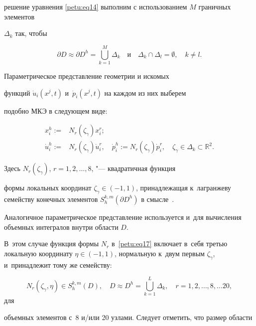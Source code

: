 решение уравнения \eqref{petu:eq14} выполним с использованием $M$ граничных элементов

$\Delta _k$ так, чтобы 

$$\partial D \approx \partial

D^h=\bigcup\limits_{k=1}^M \Delta_k \text { ~~и~~ } \Delta _k \cap \Delta_l

=\emptyset, \quad k\ne l.

$$ 

Параметрическое представление геометрии и искомых

функций $\dot {u}_i (x^j,t)$ \linebreak и~$\dot {p}_i (x^j,t)$ на каждом из них выберем

подобно МКЭ в следующем виде:

\begin{equation}

\label{petu:eq17}

\begin{aligned}

x_i^h := & N_r (\zeta_\gamma )x_i^r ; \\

\dot {u}_i^h :=& N_r (\zeta _\gamma )\dot {u}_i^r ,\quad \dot {p}_i^h :=N_r

(\zeta _\gamma )\dot {p}_i^r ,\quad \zeta _\gamma \in \Delta _k \subset \mathbb R^2.

\end{aligned}

\end{equation}

Здесь $N_r (\zeta _\gamma )$, $r=1, 2, \dots, 8$, "--- квадратичная функция

формы локальных координат $\zeta _\gamma \in (-1, 1)$, принадлежащая к~лагранжеву семейству конечных элементов $S_h^{k,m} (\partial D^h)$ в смысле~\cite{petu:bib17}.



Аналогичное параметрическое представление используется и~для вычисления объемных интегралов внутри области $D$. 

В~этом случае функция формы $N_r$ в~\eqref{petu:eq17} включает в~себя третью локальную координату $\eta \in (-1, 1)$, нормальную к~двум первым $\zeta _\gamma $, и~принадлежит тому же семейству: 

$$N_r (\zeta _\gamma,\eta )\in S_h^{k,m}(D),\quad D\approx D^h=\bigcup\limits_{k=1}^L {\Delta _k },\quad  r=1, 2,\dots, 8, \dots 20,$$ для

объемных элементов с~8 и/или 20 узлами. Следует отметить, что размер области

